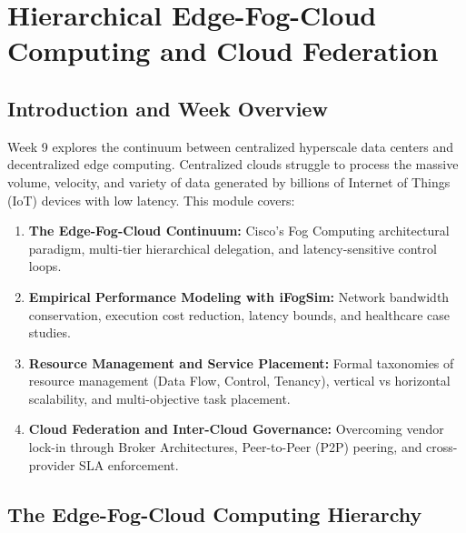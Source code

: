 \chapter{Hierarchical Edge-Fog-Cloud Computing and Cloud Federation}

\section{Introduction and Week Overview}
Week 9 explores the continuum between centralized hyperscale data centers and decentralized edge computing. Centralized clouds struggle to process the massive volume, velocity, and variety of data generated by billions of Internet of Things (IoT) devices with low latency. This module covers:
\begin{enumerate}[leftmargin=*]
  \item \textbf{The Edge-Fog-Cloud Continuum:} Cisco's Fog Computing architectural paradigm, multi-tier hierarchical delegation, and latency-sensitive control loops.
  \item \textbf{Empirical Performance Modeling with iFogSim:} Network bandwidth conservation, execution cost reduction, latency bounds, and healthcare case studies.
  \item \textbf{Resource Management and Service Placement:} Formal taxonomies of resource management (Data Flow, Control, Tenancy), vertical vs horizontal scalability, and multi-objective task placement.
  \item \textbf{Cloud Federation and Inter-Cloud Governance:} Overcoming vendor lock-in through Broker Architectures, Peer-to-Peer (P2P) peering, and cross-provider SLA enforcement.
\end{enumerate}

\section{The Edge-Fog-Cloud Computing Hierarchy}
